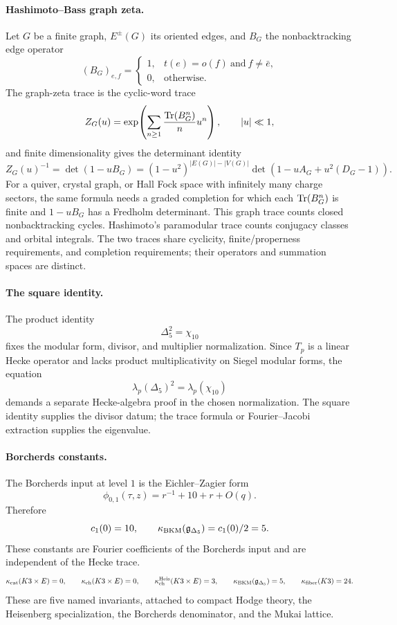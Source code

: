 \paragraph{Hashimoto--Bass graph zeta.}
Let \(G\) be a finite graph, \(E^\pm(G)\) its oriented edges, and
\(B_G\) the nonbacktracking edge operator
\[
  (B_G)_{e,f}=
  \begin{cases}
  1, & t(e)=o(f)\ \text{and}\ f\ne \bar e,\\
  0, & \text{otherwise.}
  \end{cases}
\]
The graph-zeta trace is the cyclic-word trace
\[
  Z_G(u)=
  \exp\!\left(\sum_{n\geq 1}\frac{\operatorname{Tr}(B_G^n)}{n}u^n\right),
  \qquad |u|\ll 1,
\]
and finite dimensionality gives the determinant identity
\[
  Z_G(u)^{-1}
  =\det(1-uB_G)
  =(1-u^2)^{|E(G)|-|V(G)|}
    \det\!\left(1-uA_G+u^2(D_G-1)\right).
\]
For a quiver, crystal graph, or Hall Fock space with infinitely many
charge sectors, the same formula needs a graded completion for which
each \(\operatorname{Tr}(B_G^n)\) is finite and \(1-uB_G\) has a Fredholm determinant.
This graph trace counts closed nonbacktracking cycles.  Hashimoto's
paramodular trace counts conjugacy classes and orbital integrals.  The
two traces share cyclicity, finite/properness requirements, and
completion requirements; their operators and summation spaces are
distinct.

\paragraph{The square identity.}
The product identity
\[
  \Delta_5^2=\chi_{10}
\]
fixes the modular form, divisor, and multiplier normalization.  Since
\(T_p\) is a linear Hecke operator and lacks product multiplicativity
on Siegel modular forms, the equation
\[
  \lambda_p(\Delta_5)^2=\lambda_p(\chi_{10})
\]
demands a separate Hecke-algebra proof in the chosen normalization.
The square identity supplies the divisor datum; the trace formula or
Fourier--Jacobi extraction supplies the eigenvalue.

\paragraph{Borcherds constants.}
The Borcherds input at level \(1\) is the Eichler--Zagier form
\[
  \phi_{0,1}(\tau,z)=r^{-1}+10+r+O(q).
\]
Therefore
\[
  c_1(0)=10,\qquad
  \kappa_{\mathrm{BKM}}(\mathfrak g_{\Delta_5})=c_1(0)/2=5.
\]
These constants are Fourier coefficients of the Borcherds input and are
independent of the Hecke trace.
\[
  \kappa_{\mathrm{cat}}(K3\times E)=0,\qquad
  \kappa_{\mathrm{ch}}(K3\times E)=0,\qquad
  \kappa_{\mathrm{ch}}^{\mathrm{Heis}}(K3\times E)=3,\qquad
  \kappa_{\mathrm{BKM}}(\mathfrak g_{\Delta_5})=5,\qquad
  \kappa_{\mathrm{fiber}}(K3)=24.
\]
These are five named invariants, attached to compact Hodge theory,
the Heisenberg specialization, the Borcherds denominator, and the
Mukai lattice.

